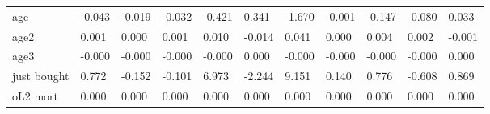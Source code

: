 \begin{table}[htbp]
\begin{tabular}{lllllllllll}
age &    -0.043 &    -0.019 &    -0.032 &    -0.421 &     0.341 &    -1.670 &    -0.001 &    -0.147 &    -0.080 &     0.033 \\  
age2 &     0.001 &     0.000 &     0.001 &     0.010 &    -0.014 &     0.041 &     0.000 &     0.004 &     0.002 &    -0.001 \\  
age3 &    -0.000 &    -0.000 &    -0.000 &    -0.000 &     0.000 &    -0.000 &    -0.000 &    -0.000 &    -0.000 &     0.000 \\  
just bought &     0.772 &    -0.152 &    -0.101 &     6.973 &    -2.244 &     9.151 &     0.140 &     0.776 &    -0.608 &     0.869 \\  
oL2 mort &     0.000 &     0.000 &     0.000 &     0.000 &     0.000 &     0.000 &     0.000 &     0.000 &     0.000 &     0.000 \\  
\hline \hline \end{tabular}
\end{table}
